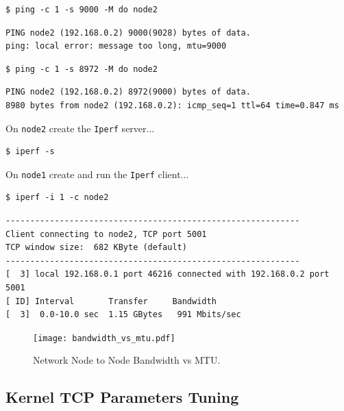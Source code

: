 \documentclass{report}
\begin{document}
\lstset{style=type}
\begin{lstlisting}
$ ping -c 1 -s 9000 -M do node2
\end{lstlisting}

\lstset{style=type}
\begin{lstlisting}
PING node2 (192.168.0.2) 9000(9028) bytes of data.
ping: local error: message too long, mtu=9000
\end{lstlisting}

\lstset{style=type}
\begin{lstlisting}
$ ping -c 1 -s 8972 -M do node2
\end{lstlisting}

\lstset{style=type}
\begin{lstlisting}
PING node2 (192.168.0.2) 8972(9000) bytes of data.
8980 bytes from node2 (192.168.0.2): icmp_seq=1 ttl=64 time=0.847 ms
\end{lstlisting}


On \verb|node2| create the \verb|Iperf| server...

\lstset{style=type}
\begin{lstlisting}
$ iperf -s
\end{lstlisting}

On \verb|node1| create and run the \verb|Iperf| client...

\lstset{style=type}
\begin{lstlisting}
$ iperf -i 1 -c node2
\end{lstlisting}

\lstset{style=type}
\begin{lstlisting}
------------------------------------------------------------
Client connecting to node2, TCP port 5001
TCP window size:  682 KByte (default)
------------------------------------------------------------
[  3] local 192.168.0.1 port 46216 connected with 192.168.0.2 port 5001
[ ID] Interval       Transfer     Bandwidth
[  3]  0.0-10.0 sec  1.15 GBytes   991 Mbits/sec
\end{lstlisting}


\begin{figure}
	\centering	
	\texttt{[image: bandwidth\_vs\_mtu.pdf]}
	\caption{Network Node to Node Bandwidth vs MTU.}
\end{figure}


\subsection{Kernel TCP Parameters Tuning}
\end{document}
